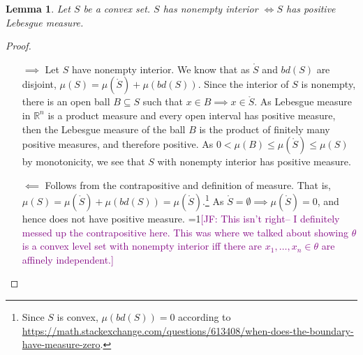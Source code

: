\documentclass[12pt]{article}
\newcommand{\Comments}{1}
\newcommand{\mynote}[2]{\ifnum\Comments=1\textcolor{#1}{#2}\fi}
\newcommand{\jessie}[1]{\mynote{purple}{[JF: #1]}}
\newcommand{\reals}{\mathbb{R}}
\newcommand{\inter}[1]{\mathring{#1}}%
\newtheorem{lemma}{Lemma}
\begin{document}
\begin{lemma}\label{lem:pos-measure-iff-nonempty-int}
	Let $S$ be a convex set.
	$S$ has nonempty interior $\iff S$ has positive Lebesgue measure.
\end{lemma}
\begin{proof}
	
	\begin{enumerate}
		\item[$\implies$]
		Let $S$ have nonempty interior.
		We know that as $\inter{S}$ and $bd(S)$ are disjoint, $\mu(S) = \mu(\inter{S}) + \mu(bd(S))$.
		Since the interior of $S$ is nonempty, there is an open ball $B \subseteq S$ such that $x \in B \implies x \in \inter S$.
		As Lebesgue measure in $\reals^n$ is a product measure and every open interval has positive measure, then the Lebesgue measure of the ball $B$ is the product of finitely many positive measures, and therefore positive.
		As $0 < \mu(B) \leq \mu(\inter S) \leq \mu(S)$ by monotonicity, we see that $S$ with nonempty interior has positive measure.
		
		\item[$\impliedby$]  Follows from the contrapositive and definition of measure.
		That is, $\mu(S) = \mu(\inter{S}) + \mu(bd(S)) = \mu(\inter{S})$.\footnote{Since $S$ is convex, $\mu(bd(S)) = 0$ according to \url{https://math.stackexchange.com/questions/613408/when-does-the-boundary-have-measure-zero}.}
		As $\inter{S} = \emptyset \implies \mu(\inter{S}) = 0$, and hence does not have positive measure.
		\jessie{This isn't right-- I definitely messed up the contrapositive here.  This was where we talked about showing $\theta$ is a convex level set with nonempty interior iff there are $x_1, \ldots, x_n \in \theta$ are affinely independent.}
	\end{enumerate}
\end{proof}
\end{document}
